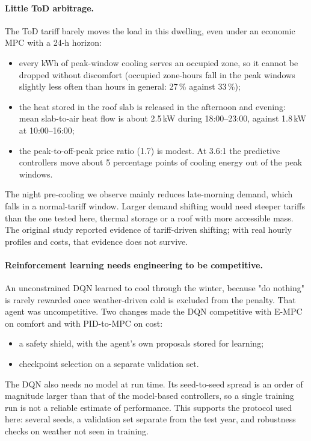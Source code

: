 \paragraph{Little ToD arbitrage.}
The ToD tariff barely moves the load in this dwelling, even under an economic MPC with a
24-h horizon:
\begin{itemize}
  \item every kWh of peak-window cooling serves an occupied zone, so it cannot be
        dropped without discomfort (occupied zone-hours fall in the peak windows
        slightly less often than hours in general: 27\,\% against 33\,\%);
  \item the heat stored in the roof slab is released in the afternoon and evening:
        mean slab-to-air heat flow is about 2.5\,kW during 18:00--23:00, against
        1.8\,kW at 10:00--16:00;
  \item the peak-to-off-peak price ratio (1.7) is modest. At 3.6:1 the predictive
        controllers move about 5 percentage points of cooling energy out of the peak
        windows.
\end{itemize}
The night pre-cooling we observe mainly reduces late-morning demand, which falls in a
normal-tariff window. Larger demand shifting would need steeper tariffs than the one tested here,
thermal storage or a roof with more accessible mass. The original study reported
evidence of tariff-driven shifting; with real hourly profiles and costs, that evidence
does not survive.

\paragraph{Reinforcement learning needs engineering to be competitive.}
An unconstrained DQN learned to cool through the winter, because "do nothing" is
rarely rewarded once weather-driven cold is excluded from the penalty. That agent was
uncompetitive. Two changes made the DQN competitive with E-MPC on comfort and with
PID-to-MPC on cost:
\begin{itemize}
  \item a safety shield, with the agent's own proposals stored for learning;
  \item checkpoint selection on a separate validation set.
\end{itemize}
The DQN also needs no model at run time. Its seed-to-seed spread is an order of
magnitude larger than that of the model-based controllers, so a single training run is
not a reliable estimate of performance. This supports the protocol used here: several
seeds, a validation set separate from the test year, and robustness checks on weather
not seen in training.


